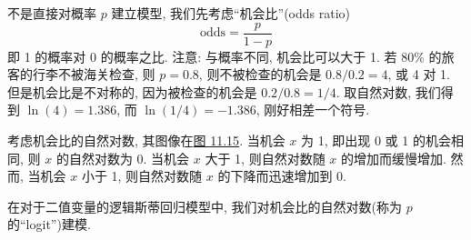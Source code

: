 不是直接对概率 $p$ 建立模型, 我们先考虑“机会比”(odds ratio)
\[
\mathrm{odds}=\frac{p}{1-p}
\]
即 1 的概率对 0 的概率之比. 注意: 与概率不同, 机会比可以大于 1. 若 80\% 的旅客的行李不被海关检查, 则 $p=0.8$, 则不被检查的机会是 $0.8/0.2=4$, 或 4 对 1. 但是机会比是不对称的, 因为被检查的机会是 $0.2/0.8=1/4$. 取自然对数, 我们得到 $\ln(4)=1.386$, 而 $\ln(1/4)=-1.386$, 刚好相差一个符号.

考虑机会比的自然对数, 其图像在\hyperref[fig:11.15]{图 11.15}. 当机会 $x$ 为 1, 即出现 0 或 1 的机会相同, 则 $x$ 的自然对数为 0. 当机会 $x$ 大于 1, 则自然对数随 $x$ 的增加而缓慢增加. 然而, 当机会 $x$ 小于 1, 则自然对数随 $x$ 的下降而迅速增加到 0.

在对于二值变量的逻辑斯蒂回归模型中, 我们对机会比的自然对数(称为 $p$ 的“logit”)建模.
